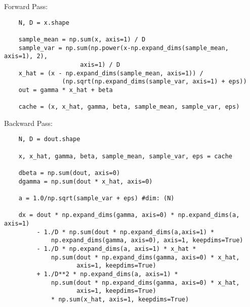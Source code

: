 \documentclass[12pt,letter]{article}
\begin{document}
\begin{enumerate}
  \pagebreak

  Forward Pass:
\begin{verbatim}
    N, D = x.shape

    sample_mean = np.sum(x, axis=1) / D
    sample_var = np.sum(np.power(x-np.expand_dims(sample_mean, axis=1), 2),
                     axis=1) / D
    x_hat = (x - np.expand_dims(sample_mean, axis=1)) / 
                (np.sqrt(np.expand_dims(sample_var, axis=1) + eps))
    out = gamma * x_hat + beta

    cache = (x, x_hat, gamma, beta, sample_mean, sample_var, eps)
\end{verbatim}
  Backward Pass:
\begin{verbatim}
    N, D = dout.shape
      
    x, x_hat, gamma, beta, sample_mean, sample_var, eps = cache

    dbeta = np.sum(dout, axis=0)
    dgamma = np.sum(dout * x_hat, axis=0)
        
    a = 1.0/np.sqrt(sample_var + eps) #dim: (N)
    
    dx = dout * np.expand_dims(gamma, axis=0) * np.expand_dims(a, axis=1)
         - 1./D * np.sum(dout * np.expand_dims(a,axis=1) * 
             np.expand_dims(gamma, axis=0), axis=1, keepdims=True)
         - 1./D * np.expand_dims(a, axis=1) * x_hat * 
             np.sum(dout * np.expand_dims(gamma, axis=0) * x_hat,
                    axis=1, keepdims=True)
         + 1./D**2 * np.expand_dims(a, axis=1) * 
             np.sum(dout * np.expand_dims(gamma, axis=0) * x_hat, 
                    axis=1, keepdims=True) 
             * np.sum(x_hat, axis=1, keepdims=True)
\end{verbatim}

\end{enumerate}
\end{document}
